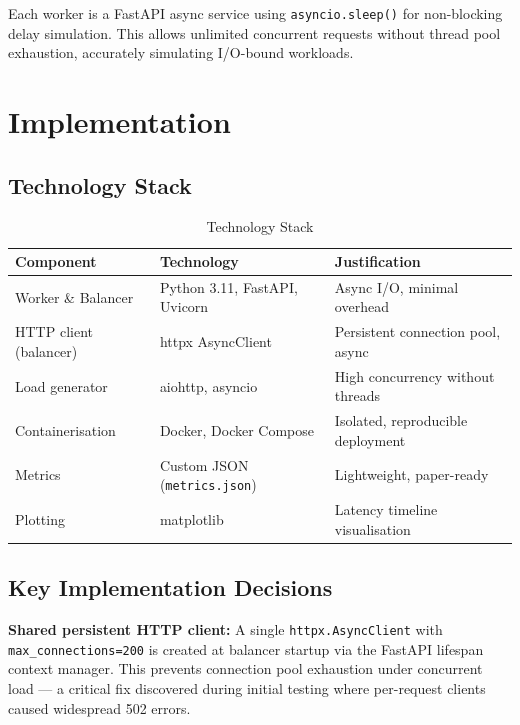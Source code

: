 \documentclass[conference]{IEEEtran}
\begin{document}
Each worker is a FastAPI async service using \texttt{asyncio.sleep()} for non-blocking delay simulation. This allows unlimited concurrent requests without thread pool exhaustion, accurately simulating I/O-bound workloads.

\section{Implementation}

\subsection{Technology Stack}

\begin{table}[h]
  \centering
  \caption{Technology Stack}
  \begin{tabular}{p{2.2cm}p{2.8cm}p{2.8cm}}
    \toprule
    \textbf{Component} & \textbf{Technology} & \textbf{Justification} \\
    \midrule
    Worker \& Balancer & Python 3.11, FastAPI, Uvicorn & Async I/O, minimal overhead \\
    HTTP client (balancer) & httpx AsyncClient & Persistent connection pool, async \\
    Load generator & aiohttp, asyncio & High concurrency without threads \\
    Containerisation & Docker, Docker Compose & Isolated, reproducible deployment \\
    Metrics & Custom JSON (\texttt{metrics.json}) & Lightweight, paper-ready \\
    Plotting & matplotlib & Latency timeline visualisation \\
    \bottomrule
  \end{tabular}
\end{table}

\subsection{Key Implementation Decisions}

\textbf{Shared persistent HTTP client:} A single \texttt{httpx.AsyncClient} with \texttt{max\_connections=200} is created at balancer startup via the FastAPI lifespan context manager. This prevents connection pool exhaustion under concurrent load --- a critical fix discovered during initial testing where per-request clients caused widespread 502 errors.
\end{document}
